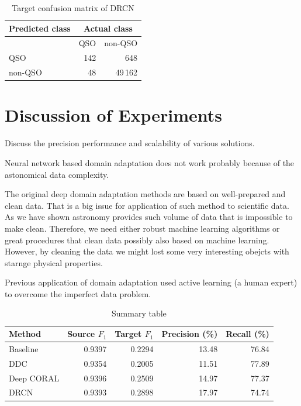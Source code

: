 \begin{table}
\begin{center}
\begin{tabular}{|l|r|r|}
	\hline
	Predicted class & \multicolumn{2}{c|}{Actual class} \\
	\hline \hline
	& QSO & non-QSO \\ \hline
	QSO & 142 & 648 \\ \hline
	non-QSO & 48 & 49\,162 \\ \hline
\end{tabular}
\end{center}
\caption{Target confusion matrix of DRCN}
\end{table}

\section{Discussion of Experiments}

Discuss the precision performance and scalability of various solutions.

Neural network based domain adaptation does not work probably because of the astonomical data complexity.

The original deep domain adaptation methods are based on well-prepared and clean data.
That is a big issue for application of such method to scientific data.
As we have shown astronomy provides such volume of data
that is impossible to make clean.
Therefore, we need either robust machine learning algorithms
or great procedures that clean data possibly also based on machine learning.
However, by cleaning the data we might lost some very interesting obejcts with starnge physical properties.

Previous application of domain adaptation used active learning (a human expert)
to overcome the imperfect data problem.

\begin{table}
\begin{center}
\begin{tabular}{|l|r|r|r|r|}
	\hline
	Method & Source \(F_1\) & Target \(F_1\) & Precision (\%) & Recall (\%) \\
	\hline \hline
	Baseline & 0.9397 & 0.2294 & 13.48 & 76.84 \\ \hline
	DDC & 0.9354 & 0.2005 & 11.51 & 77.89 \\ \hline
	Deep CORAL & 0.9396 & 0.2509 & 14.97 & 77.37 \\ \hline
	DRCN & 0.9393 & 0.2898 & 17.97 & 74.74 \\ \hline
\end{tabular}
\end{center}
\caption{Summary table}
\end{table}

